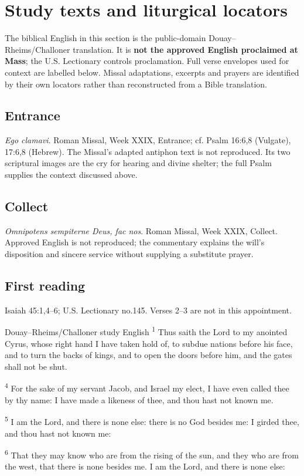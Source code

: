 \section{Study texts and liturgical locators}
The biblical English in this section is the public-domain Douay--Rheims/Challoner translation. It is \textbf{not the approved English proclaimed at Mass}; the U.S. Lectionary controls proclamation. Full verse envelopes used for context are labelled below. Missal adaptations, excerpts and prayers are identified by their own locators rather than reconstructed from a Bible translation.

\subsection{Entrance}
\label{proper-entrance}
\textit{Ego clamavi}. Roman Missal, Week XXIX, Entrance; cf. Psalm 16:6,8 (Vulgate), 17:6,8 (Hebrew). The Missal's adapted antiphon text is not reproduced. Its two scriptural images are the cry for hearing and divine shelter; the full Psalm supplies the context discussed above.

\subsection{Collect}
\label{proper-collect}
\textit{Omnipotens sempiterne Deus, fac nos}. Roman Missal, Week XXIX, Collect. Approved English is not reproduced; the commentary explains the will's disposition and sincere service without supplying a substitute prayer.

\subsection{First reading}
\label{proper-first-reading}
Isaiah 45:1,4--6; U.S. Lectionary no.145. Verses 2--3 are not in this appointment.
\begin{englishwitness}{Douay--Rheims/Challoner study English}
\textsuperscript{1} Thus saith the Lord to my anointed Cyrus, whose right hand I have taken hold of, to subdue nations before his face, and to turn the backs of kings, and to open the doors before him, and the gates shall not be shut.

\textsuperscript{4} For the sake of my servant Jacob, and Israel my elect, I have even called thee by thy name: I have made a likeness of thee, and thou hast not known me.

\textsuperscript{5} I am the Lord, and there is none else: there is no God besides me: I girded thee, and thou hast not known me:

\textsuperscript{6} That they may know who are from the rising of the sun, and they who are from the west, that there is none besides me. I am the Lord, and there is none else:
\end{englishwitness}

